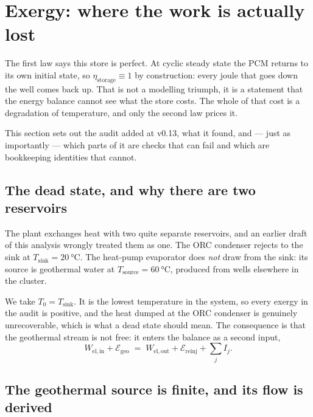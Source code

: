 \section{Exergy: where the work is actually lost}
\label{sec:exergy}

The first law says this store is perfect. At cyclic steady state the PCM
returns to its own initial state, so $\eta_{\mathrm{storage}} \equiv 1$ by
construction: every joule that goes down the well comes back up. That is not
a modelling triumph, it is a statement that the energy balance cannot see
what the store costs. The whole of that cost is a degradation of temperature,
and only the second law prices it.

This section sets out the audit added at v0.13, what it found, and --- just
as importantly --- which parts of it are checks that can fail and which are
bookkeeping identities that cannot.

\subsection{The dead state, and why there are two reservoirs}
\label{sec:exergy:deadstate}

The plant exchanges heat with two quite separate reservoirs, and an earlier
draft of this analysis wrongly treated them as one. The ORC condenser rejects
to the sink at $T_{\mathrm{sink}} = \SI{20}{\celsius}$. The heat-pump
evaporator does \emph{not} draw from the sink: its source is geothermal water
at $T_{\mathrm{source}} = \SI{60}{\celsius}$, produced from wells elsewhere in
the cluster.

We take $T_0 = T_{\mathrm{sink}}$. It is the lowest temperature in the system,
so every exergy in the audit is positive, and the heat dumped at the ORC
condenser is genuinely unrecoverable, which is what a dead state should mean.
The consequence is that the geothermal stream is not free: it enters the
balance as a second input,
%
\begin{equation}
  W_{\mathrm{el,in}} + \mathcal{E}_{\mathrm{geo}}
  \;=\; W_{\mathrm{el,out}} + \mathcal{E}_{\mathrm{reinj}}
        + \sum_j I_j .
  \label{eq:exergy:balance}
\end{equation}

\subsection{The geothermal source is finite, and its flow is derived}
\label{sec:exergy:resource}

